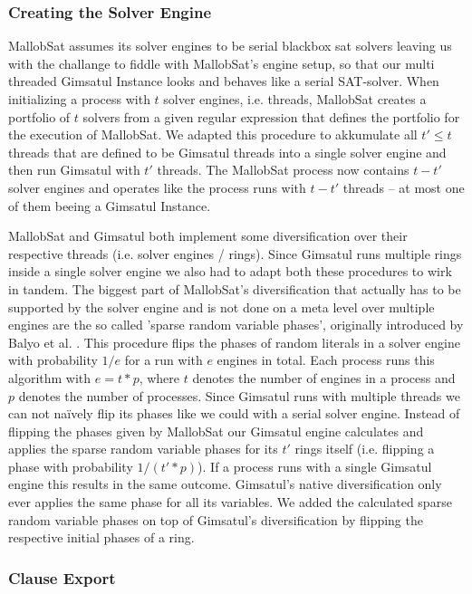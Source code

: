 \documentclass[12pt,a4paper,twoside]{scrartcl}
\numberwithin{equation}{section}
\begin{document}
\subsubsection{Creating the Solver Engine}

MallobSat assumes its solver engines to be serial blackbox sat solvers leaving us with the challange to fiddle with MallobSat's engine setup, so that our multi threaded Gimsatul Instance looks and behaves like a serial SAT-solver.
When initializing a process with $t$ solver engines, i.e. threads, MallobSat creates a portfolio of $t$ solvers from a given regular expression that defines the portfolio for the execution of MallobSat. We adapted this procedure to akkumulate all $t' \leq t$ threads that are defined to be Gimsatul threads into a single solver engine and then run Gimsatul with $t'$ threads. The MallobSat process now contains $t - t'$ solver engines and operates like the process runs with $t - t'$ threads -- at most one of them beeing a Gimsatul Instance.

MallobSat and Gimsatul both implement some diversification over their respective threads (i.e. solver engines / rings). Since Gimsatul runs multiple rings inside a single solver engine we also had to adapt both these procedures to wirk in tandem.
The biggest part of MallobSat's diversification that actually has to be supported by the solver engine and is not done on a meta level over multiple engines are the so called 'sparse random variable phases', originally introduced by Balyo et al. \cite{hordeSat}. This procedure flips the phases of random literals in a solver engine with probability $1 / e$ for a run with $e$ engines in total. Each process runs this algorithm with $e = t * p$, where $t$ denotes the number of engines in a process and $p$ denotes the number of processes. Since Gimsatul runs with multiple threads we can not na\"ively flip its phases like we could with a serial solver engine. Instead of flipping the phases given by MallobSat our Gimsatul engine calculates and applies the sparse random variable phases for its $t'$ rings itself (i.e. flipping a phase with probability $1 / (t' * p)$). If a process runs with a single Gimsatul engine this results in the same outcome.
Gimsatul's native diversification only ever applies the same phase for all its variables. We added the calculated sparse random variable phases on top of Gimsatul's diversification by flipping the respective initial phases of a ring.

\subsubsection{Clause Export}
\end{document}
